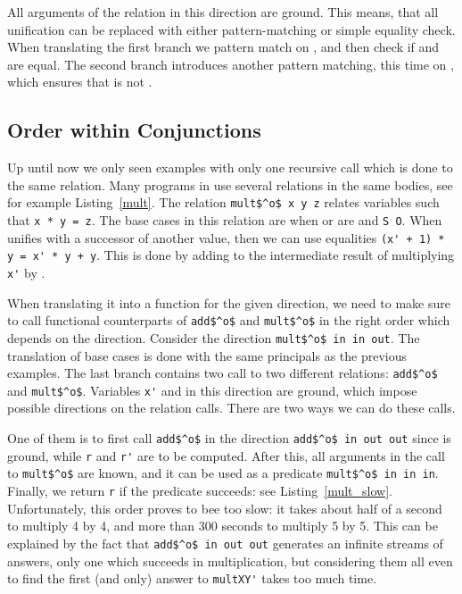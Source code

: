 All arguments of the relation in this direction are ground.
This means, that all unification can be replaced with either pattern-matching or simple equality check.
When translating the first \conde branch we pattern match on \x, and then check if \y and \z are equal.
The second \conde branch introduces another pattern matching, this time on \z, which ensures that \z is not \zero.




\subsection{Order within Conjunctions}






Up until now we only seen examples with only one recursive call which is done to the same relation.
Many programs in \mk use several relations in the same bodies, see for example Listing~\ref{mult}.
The relation \lstinline{mult$^o$ x y z} relates variables such that \lstinline{x * y = z}.
The base cases in this relation are when \x or \y are \zero and \lstinline{S O}.
When \x unifies with a successor of another value, then we can use equalities \lstinline{(x' + 1) * y = x' * y + y}.
This is done by adding \y to the intermediate result of multiplying \lstinline{x'} by \y.

When translating it into a function for the given direction, we need to make sure to call functional counterparts of \lstinline{add$^o$} and \lstinline{mult$^o$} in the right order which depends on the direction.
Consider the direction \lstinline{mult$^o$ in in out}.
The translation of base cases is done with the same principals as the previous examples.
The last \conde branch contains two call to two different relations: \lstinline{add$^o$} and \lstinline{mult$^o$}.
Variables \lstinline{x'} and \y in this direction are ground, which impose possible directions on the relation calls.
There are two ways we can do these calls.

One of them is to first call \lstinline{add$^o$} in the direction \lstinline{add$^o$ in out out} since \y is ground, while \lstinline{r} and \lstinline{r'} are to be computed.
After this, all arguments in the call to \lstinline{mult$^o$} are known, and it can be used as a predicate \lstinline{mult$^o$ in in in}.
Finally, we return \lstinline{r} if the predicate succeeds: see Listing~\ref{mult_slow}.
Unfortunately, this order proves to bee too slow: it takes about half of a second to multiply 4 by 4, and more than 300 seconds to multiply 5 by 5.
This can be explained by the fact that \lstinline{add$^o$ in out out} generates an infinite streams of answers, only one which succeeds in multiplication, but considering them all even to find the first (and only) answer to \lstinline{multXY'} takes too much time.

